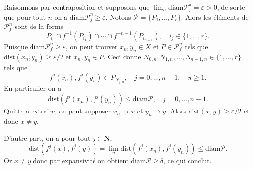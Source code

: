 \documentclass[a4paper,12pt,openany]{article}
\theoremstyle{plain}
\theoremstyle{definition}
\newcommand{\N}{\mathbf{N}}
\newcommand{\Pcal}{\mathcal{P}}
\newcommand{\diam}{\mathrm{diam}}
\newcommand{\dist}{\mathrm{dist}}
\begin{document}
\noindent 
Raisonnons par contraposition et supposons que $\lim_n \diam \Pcal^n_f = \varepsilon > 0$, de sorte que pour tout $n$ on a $\diam \Pcal^n_f \geqslant \varepsilon$.  Notons $\Pcal = \{P_1, \dots, P_r\}$. Alors les \'el\'ements de $\Pcal^n_f$ sont de la forme
$$
P_{i_0} \cap f^{-1}(P_{i_1}) \cap \cdots \cap f^{-n+1}(P_{i_{n-1}}), \quad i_j \in \{1,\dots, r\}.
$$
Puisque $\diam \Pcal^n_f \geqslant \varepsilon$, on peut trouver $x_n, y_n \in X$ et $P\in \Pcal^n_f$ tels que $\dist(x_n, y_n) \geqslant \varepsilon / 2$ et $x_n, y_n \in P$.  Ceci donne $N_{0,n}, N_{1,n}, \dots, N_{n-1,n} \in \{1, \dots, r\}$ tels que 
$$
f^j(x_n), f^j(y_n) \in P_{N_{j,n}}, \quad j = 0, \dots, n-1, \quad  n \geqslant 1.
$$
En particulier on a
 $$
\dist(f^j(x_n), f^j(y_n)) \leqslant \diam \Pcal, \quad j=0, \dots, n-1.
$$
Quitte a extraire, on peut supposer $x_n \to x$ et $y_n \to y$. Alors $\dist(x,y) \geqslant \varepsilon / 2$ et donc $x \neq y$.  

\noindent
D'autre part, on a pour tout $j \in \N$,
$$
\dist(f^j(x),f^j(y)) = \lim_n \dist(f^j(x_n), f^j(y_n)) \leqslant \diam\Pcal.
$$
Or $x\neq y$ donc par expansivit\'e on obtient $\diam \Pcal \geqslant \delta$, ce qui conclut.
\vspace{0.6cm}

 \vspace{1.5mm}
\end{document}
